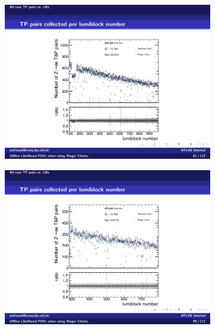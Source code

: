 \begin{figure}[b]
\centering
\begin{subfigure}[c]{.49\textwidth}
\centering
\includegraphics[width=\textwidth]{appendices/figures/pairs_wrt_lb/run331975}%
\caption{\label{fig:run331975}}
\end{subfigure}
\hfill
\begin{subfigure}[c]{.49\textwidth}
\includegraphics[width=\textwidth]{appendices/figures/pairs_wrt_lb/run334779}%
\caption{\label{fig:run334779}}
\end{subfigure} \\
\begin{subfigure}[c]{.30\textwidth}
\centering

\end{subfigure}
\end{figure}
